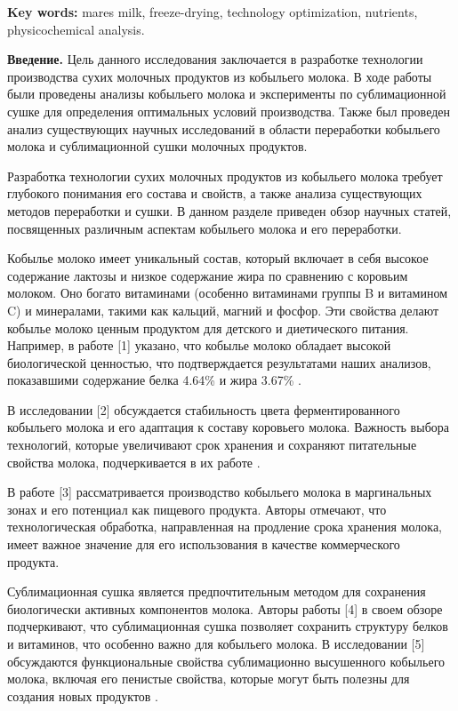 {\bfseries Key words:} mare\textquotesingle s milk, freeze-drying,
technology optimization, nutrients, physicochemical analysis.

{\bfseries Введение.} Цель данного исследования заключается в разработке
технологии производства сухих молочных продуктов из кобыльего молока. В
ходе работы были проведены анализы кобыльего молока и эксперименты по
сублимационной сушке для определения оптимальных условий производства.
Также был проведен анализ существующих научных исследований в области
переработки кобыльего молока и сублимационной сушки молочных продуктов.

Разработка технологии сухих молочных продуктов из кобыльего молока
требует глубокого понимания его состава и свойств, а также анализа
существующих методов переработки и сушки. В данном разделе приведен
обзор научных статей, посвященных различным аспектам кобыльего молока и
его переработки.

Кобылье молоко имеет уникальный состав, который включает в себя высокое
содержание лактозы и низкое содержание жира по сравнению с коровьим
молоком. Оно богато витаминами (особенно витаминами группы B и витамином
C) и минералами, такими как кальций, магний и фосфор. Эти свойства
делают кобылье молоко ценным продуктом для детского и диетического
питания. Например, в работе {[}1{]} указано, что кобылье молоко обладает
высокой биологической ценностью, что подтверждается результатами наших
анализов, показавшими содержание белка 4.64\% и жира 3.67\% .

В исследовании {[}2{]} обсуждается стабильность цвета ферментированного
кобыльего молока и его адаптация к составу коровьего молока. Важность
выбора технологий, которые увеличивают срок хранения и сохраняют
питательные свойства молока, подчеркивается в их работе .

В работе {[}3{]} рассматривается производство кобыльего молока в
маргинальных зонах и его потенциал как пищевого продукта. Авторы
отмечают, что технологическая обработка, направленная на продление срока
хранения молока, имеет важное значение для его использования в качестве
коммерческого продукта.

Сублимационная сушка является предпочтительным методом для сохранения
биологически активных компонентов молока. Авторы работы {[}4{]} в своем
обзоре подчеркивают, что сублимационная сушка позволяет сохранить
структуру белков и витаминов, что особенно важно для кобыльего молока. В
исследовании {[}5{]} обсуждаются функциональные свойства сублимационно
высушенного кобыльего молока, включая его пенистые свойства, которые
могут быть полезны для создания новых продуктов .

